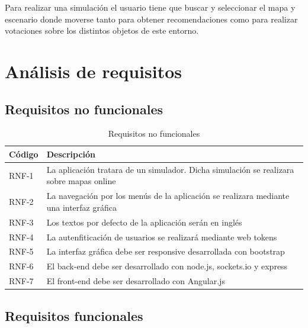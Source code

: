 Para realizar una simulación el usuario tiene que buscar y seleccionar el mapa y escenario donde moverse tanto para obtener recomendaciones como para realizar votaciones sobre los distintos objetos de este entorno.

\section{Análisis de requisitos}

\subsection{Requisitos no funcionales}

\begin{table}[H]
	\begin{center}
		\begin{tabular}{|p{1.5cm}| p{10.5cm}|}
			\hline
			Código & Descripción \\
			\hline
			RNF-1  & La aplicación tratara de un simulador. Dicha simulación se realizara sobre mapas online\\ \hline
			RNF-2  & La navegación por los menús de la aplicación se realizara mediante una interfaz gráfica\\ \hline
			RNF-3  & Los textos por defecto de la aplicación serán en inglés\\ \hline
			RNF-4  & La autenfiticación de usuarios se realizará mediante web tokens\\ \hline
			RNF-5  & La interfaz gráfica debe ser responsive desarrollada con bootstrap\\ \hline
			RNF-6  & El back-end debe ser desarrollado con node.js, sockets.io y express \\ \hline
			RNF-7  & El front-end debe ser desarrollado con Angular.js\\ \hline
		\end{tabular}
		\caption{Requisitos no funcionales}
		\label{tabla:requisitosNoFuncionales}
	\end{center}
\end{table}

\newpage

\subsection{Requisitos funcionales}


